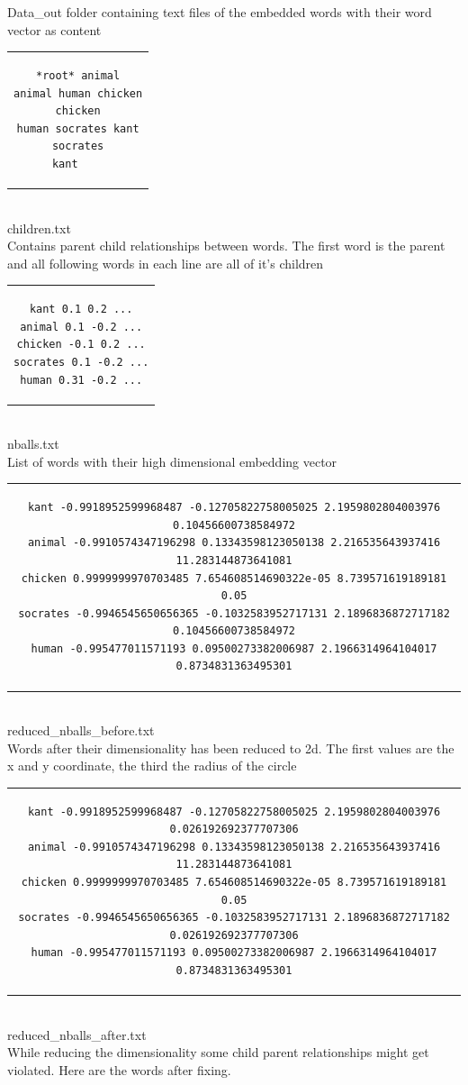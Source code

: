\documentclass[]{article}
\begin{document}
Data\_out folder containing text files of the embedded words with their word vector as content

\begin{tabular}{c}
\begin{lstlisting}
*root* animal
animal human chicken
chicken
human socrates kant
socrates
kant	
\end{lstlisting}
\end{tabular}
\\children.txt
\\Contains parent child relationships between words. The first word is the parent and all following words in each line are all of it's children

\begin{tabular}{c}
\begin{lstlisting}
kant 0.1 0.2 ...
animal 0.1 -0.2 ...
chicken -0.1 0.2 ...
socrates 0.1 -0.2 ...
human 0.31 -0.2 ...
\end{lstlisting}
\end{tabular}
\\nballs.txt
\\List of words with their high dimensional embedding vector

\begin{tabular}{c}
\begin{lstlisting}
kant -0.9918952599968487 -0.12705822758005025 2.1959802804003976 0.10456600738584972
animal -0.9910574347196298 0.13343598123050138 2.216535643937416 11.283144873641081
chicken 0.9999999970703485 7.654608514690322e-05 8.739571619189181 0.05
socrates -0.9946545650656365 -0.1032583952717131 2.1896836872717182 0.10456600738584972
human -0.995477011571193 0.09500273382006987 2.1966314964104017 0.8734831363495301
\end{lstlisting}
\end{tabular}
\\reduced\_nballs\_before.txt
\\Words after their dimensionality has been reduced to 2d. The first values are the x and y coordinate, the third the radius of the circle

\begin{tabular}{c}
\begin{lstlisting}
kant -0.9918952599968487 -0.12705822758005025 2.1959802804003976 0.026192692377707306
animal -0.9910574347196298 0.13343598123050138 2.216535643937416 11.283144873641081
chicken 0.9999999970703485 7.654608514690322e-05 8.739571619189181 0.05
socrates -0.9946545650656365 -0.1032583952717131 2.1896836872717182 0.026192692377707306
human -0.995477011571193 0.09500273382006987 2.1966314964104017 0.8734831363495301
\end{lstlisting}
\end{tabular}
\\reduced\_nballs\_after.txt
\\While reducing the dimensionality some child parent relationships might get violated. Here are the words after fixing.
\end{document}
